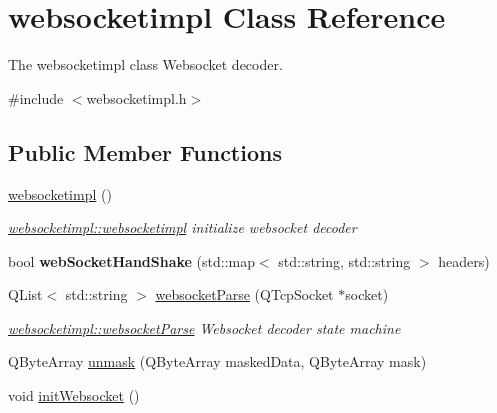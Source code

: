 \hypertarget{classwebsocketimpl}{\section{websocketimpl Class Reference}
\label{classwebsocketimpl}
}


The websocketimpl class Websocket decoder.  




{\ttfamily \#include $<$websocketimpl.\-h$>$}

\subsection*{Public Member Functions}
\begin{DoxyCompactItemize}
\item 
\hypertarget{classwebsocketimpl_a8d0888448cc98685c7f941fbe447ecd0}{\hyperlink{classwebsocketimpl_a8d0888448cc98685c7f941fbe447ecd0}{websocketimpl} ()}\label{classwebsocketimpl_a8d0888448cc98685c7f941fbe447ecd0}

\begin{DoxyCompactList}\small\item\em \hyperlink{classwebsocketimpl_a8d0888448cc98685c7f941fbe447ecd0}{websocketimpl\-::websocketimpl} initialize websocket decoder \end{DoxyCompactList}\item 
\hypertarget{classwebsocketimpl_a97a91164ff71d904b908f6c425c7c521}{bool {\bfseries web\-Socket\-Hand\-Shake} (std\-::map$<$ std\-::string, std\-::string $>$ headers)}\label{classwebsocketimpl_a97a91164ff71d904b908f6c425c7c521}

\item 
Q\-List$<$ std\-::string $>$ \hyperlink{classwebsocketimpl_ae5ae4cafabbff7ed2fab292e4ed1daf3}{websocket\-Parse} (Q\-Tcp\-Socket $\ast$socket)
\begin{DoxyCompactList}\small\item\em \hyperlink{classwebsocketimpl_ae5ae4cafabbff7ed2fab292e4ed1daf3}{websocketimpl\-::websocket\-Parse} Websocket decoder state machine \end{DoxyCompactList}\item 
Q\-Byte\-Array \hyperlink{classwebsocketimpl_a796980528878c5d6279c96aa95ccefcb}{unmask} (Q\-Byte\-Array masked\-Data, Q\-Byte\-Array mask)
\item 
\hypertarget{classwebsocketimpl_a67fa07befa5af268b8f035ae4d33cd55}{void \hyperlink{classwebsocketimpl_a67fa07befa5af268b8f035ae4d33cd55}{init\-Websocket} ()}\label{classwebsocketimpl_a67fa07befa5af268b8f035ae4d33cd55}


\end{DoxyCompactItemize}
